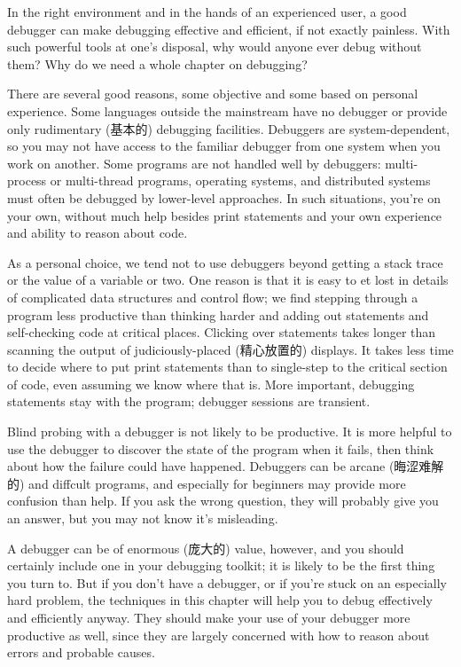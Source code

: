 In the right environment and in the hands of an experienced user, a good
debugger can make debugging effective and efficient, if not exactly
painless. With such powerful tools at one's disposal, why would anyone ever
debug without them? Why do we need a whole chapter on debugging?

There are several good reasons, some objective and some based on personal
experience. Some languages outside the mainstream have no debugger or
provide only rudimentary (基本的) debugging facilities. Debuggers are
system-dependent, so you may not have access to the familiar debugger from
one system when you work on another. Some programs are not handled well by
debuggers: multi-process or multi-thread programs, operating systems, and
distributed systems must often be debugged by lower-level approaches. In
such situations, you're on your own, without much help besides print
statements and your own experience and ability to reason about code.

As a personal choice, we tend not to use debuggers beyond getting a stack
trace or the value of a variable or two. One reason is that it is easy to
et lost in details of complicated data structures and control flow; we find
stepping through a program less productive than thinking harder and adding
out statements and self-checking code at critical places. Clicking over
statements takes longer than scanning the output of judiciously-placed
(精心放置的) displays. It takes less time to decide where to put print
statements than to single-step to the critical section of code, even
assuming we know where that is. More important, debugging statements stay
with the program; debugger sessions are transient.

Blind probing with a debugger is not likely to be productive. It is more
helpful to use the debugger to discover the state of the program when it
fails, then think about how the failure could have happened. Debuggers can
be arcane (晦涩难解的) and diffcult programs, and especially for beginners
may provide more confusion than help. If you ask the wrong question, they
will probably give you an answer, but you may not know it's misleading.

A debugger can be of enormous (庞大的) value, however, and you should
certainly include one in your debugging toolkit; it is likely to be the
first thing you turn to. But if you don't have a debugger, or if you're
stuck on an especially hard problem, the techniques in this chapter will
help you to debug effectively and efficiently anyway. They should make your
use of your debugger more productive as well, since they are largely
concerned with how to reason about errors and probable causes.


